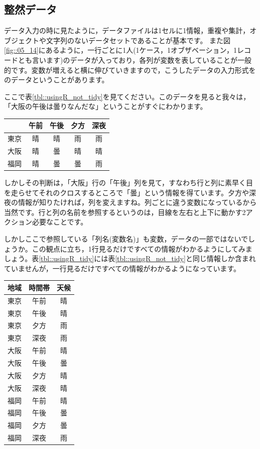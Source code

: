 \documentclass{ltjsbook}
\begin{document}
\subsection{整然データ}
データ入力の時に見たように，データファイルは1セルに1情報，重複や集計，オブジェクトや文字列のないデータセットであることが基本です。
また図\ref{fig::05_14}にあるように，一行ごとに1人(1ケース，1オブザベーション，1レコードとも言います)のデータが入っており，各列が変数を表していることが一般的です。変数が増えると横に伸びていきますので，こうしたデータの入力形式をのデータということがあります。

ここで表\ref{tbl::usingR_not_tidy}を見てください。このデータを見ると我々は，「大阪の午後は曇りなんだな」ということがすぐにわかります。
\begin{center}
	\begin{tabular}{c|cccc}
		   & 午前 & 午後 & 夕方 & 深夜 \\\hline
		東京 & 晴  & 晴  & 雨  & 雨  \\
		大阪 & 晴  & 曇  & 晴  & 晴  \\
		福岡 & 晴  & 曇  & 曇  & 雨  \\\hline
	\end{tabular}
	\label{tbl::usingR_not_tidy}
\end{center}
しかしその判断は，「大阪」行の「午後」列を見て，すなわち行と列に素早く目を走らせてそれのクロスするところで「曇」という情報を得ています。夕方や深夜の情報が知りたければ，列を変えますね。列ごとに違う変数になっているから当然です。行と列の名前を参照するというのは，目線を左右と上下に動かす2アクション必要なことです。

しかしここで参照している「列名(変数名)」も変数，データの一部ではないでしょうか。この観点に立ち，1行見るだけですべての情報がわかるようにしてみましょう。表\ref{tbl::usingR_tidy}には表\ref{tbl::usingR_not_tidy}と同じ情報しか含まれていませんが，一行見るだけですべての情報がわかるようになっています。

\begin{center}
	\begin{tabular}{ccc}
		地域 & 時間帯 & 天候 \\\hline
		東京 & 午前  & 晴  \\
		東京 & 午後  & 晴  \\
		東京 & 夕方  & 雨  \\
		東京 & 深夜  & 雨  \\
		大阪 & 午前  & 晴  \\
		大阪 & 午後  & 曇  \\
		大阪 & 夕方  & 晴  \\
		大阪 & 深夜  & 晴  \\
		福岡 & 午前  & 晴  \\
		福岡 & 午後  & 曇  \\
		福岡 & 夕方  & 曇  \\
		福岡 & 深夜  & 雨  \\\hline
	\end{tabular}
	\label{tbl::usingR_tidy}
\end{center}
\end{document}
